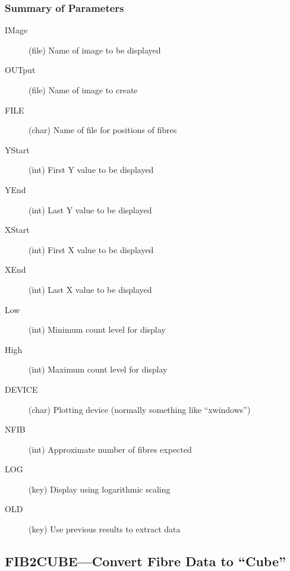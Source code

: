 \subsubsection{Summary of Parameters}

\begin{description}
\item[IMage] (file) Name of image to be displayed 
\item[OUTput] (file) Name of image to create
\item[FILE] (char) Name of file for positions of fibres
\item[YStart] (int) First Y value to be displayed 
\item[YEnd] (int) Last Y value to be displayed 
\item[XStart] (int) First X value to be displayed 
\item[XEnd] (int) Last X value to be displayed 
\item[Low] (int) Minimum count level for display 
\item[High] (int) Maximum count level for display 
\item[DEVICE] (char) Plotting device (normally something like ``xwindows'')
\item[NFIB] (int) Approximate number of fibres expected
\item[LOG] (key) Display using logarithmic scaling 
\item[OLD] (key) Use previous results to extract data
\end{description}

\subsection{FIB2CUBE---Convert Fibre Data to ``Cube''}


